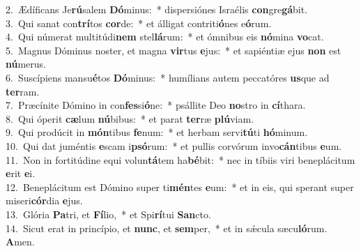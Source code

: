 {2.~}Ædíficans Je\textbf{rú}salem \textbf{Dó}minus:~* dispersiónes Israélis \textbf{con}gre\textbf{gá}bit.\\
{3.~}Qui sanat con\textbf{trí}tos \textbf{cor}de:~* et álligat contriti\textbf{ó}nes e\textbf{ó}rum.\\
{4.~}Qui númerat multitúdi\textbf{nem} stel\textbf{lá}rum:~* et ómnibus eis \textbf{nó}mina \textbf{vo}cat.\\
{5.~}Magnus Dóminus noster, et magna \textbf{vir}tus \textbf{e}jus:~* et sapiéntiæ ejus \textbf{non} est \textbf{nú}merus.\\
{6.~}Suscípiens mansu\textbf{é}tos \textbf{Dó}minus:~* humílians autem peccatóres \textbf{us}que ad \textbf{ter}ram.\\
{7.~}Præcínite Dómino in con\textbf{fes}si\textbf{ó}ne:~* psállite Deo \textbf{no}stro in \textbf{cí}thara.\\
{8.~}Qui óperit \textbf{cæ}lum \textbf{nú}bibus:~* et parat \textbf{ter}ræ \textbf{plú}viam.\\
{9.~}Qui prodúcit in \textbf{món}tibus \textbf{fe}num:~* et herbam servi\textbf{tú}ti \textbf{hó}minum.\\
{10.~}Qui dat juméntis \textbf{e}scam i\textbf{psó}rum:~* et pullis corvórum invo\textbf{cán}tibus \textbf{e}um.\\
{11.~}Non in fortitúdine equi volun\textbf{tá}tem ha\textbf{bé}bit:~* nec in tíbiis viri beneplácitum \textbf{e}rit \textbf{e}i.\\
{12.~}Beneplácitum est Dómino super ti\textbf{mén}tes \textbf{e}um:~* et in eis, qui sperant super miseri\textbf{cór}dia \textbf{e}jus.\\
{13.~}Glória \textbf{Pa}tri, et \textbf{Fí}lio,~* et Spi\textbf{rí}tui \textbf{San}cto.\\
{14.~}Sicut erat in princípio, et \textbf{nunc}, et \textbf{sem}per,~* et in sǽcula sæcu\textbf{ló}rum. \textbf{A}men.\\

